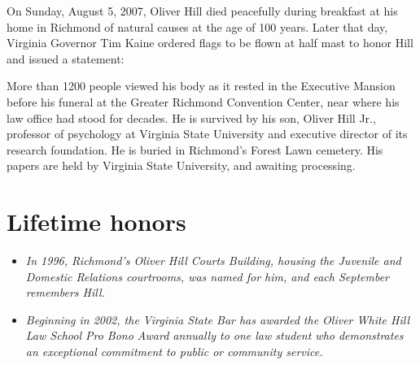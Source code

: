 On Sunday, August 5, 2007, Oliver Hill died peacefully during breakfast
at his home in Richmond of natural causes at the age of 100 years. Later
that day, Virginia Governor Tim Kaine ordered flags to be flown at half
mast to honor Hill and issued a statement:

More than 1200 people viewed his body as it rested in the Executive
Mansion before his funeral at the Greater Richmond Convention Center,
near where his law office had stood for decades. He is survived by his
son, Oliver Hill Jr., professor of psychology at Virginia State
University and executive director of its research foundation. He is
buried in Richmond's Forest Lawn cemetery. His papers are held by
Virginia State University, and awaiting processing.

\section{Lifetime honors}\label{lifetime-honors}

\begin{itemize}
\item
  \emph{In 1996, Richmond's Oliver Hill Courts Building, housing the
  Juvenile and Domestic Relations courtrooms, was named for him, and
  each September remembers Hill.}
\item
  \emph{Beginning in 2002, the Virginia State Bar has awarded the Oliver
  White Hill Law School Pro Bono Award annually to one law student who
  demonstrates an exceptional commitment to public or community
  service.}
\end{itemize}

